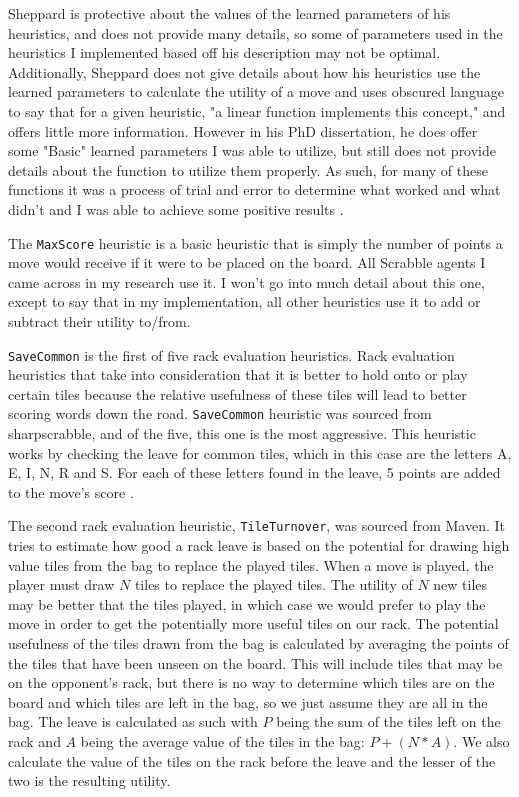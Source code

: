 \documentclass[letterpaper]{article}
\begin{document}
Sheppard is protective about the values of the learned parameters of his heuristics, and does not provide many details, so some of parameters used in the heuristics I implemented based off his description may not be optimal. Additionally, Sheppard does not give details about how his heuristics use the learned parameters to calculate the utility of a move and uses obscured language to say that for a given heuristic, "a linear function implements this concept," and offers little more information\cite{1sheppard2002}. However in his PhD dissertation, he does offer some "Basic" learned parameters I was able to utilize, but still does not provide details about the function to utilize them properly. As such, for many of these functions it was a process of trial and error to determine what worked and what didn't and I was able to achieve some positive results \cite{2sheppard2002}.

The \texttt{MaxScore} heuristic is a basic heuristic that is simply the number of points a move would receive if it were to be placed on the board. All Scrabble agents I came across in my research use it. I won't go into much detail about this one, except to say that in my implementation, all other heuristics use it to add or subtract their utility to/from.

\texttt{SaveCommon} is the first of five rack evaluation heuristics. Rack evaluation heuristics that take into consideration that it is better to hold onto or play certain tiles because the relative usefulness of these tiles will lead to better scoring words down the road. \texttt{SaveCommon} heuristic was sourced from sharpscrabble, and of the five, this one is the most aggressive. This heuristic works by checking the leave for common tiles, which in this case are the letters A, E, I, N, R and S. For each of these letters found in the leave, 5 points are added to the move's score \cite{sharpscrabble}.

The second rack evaluation heuristic, \texttt{TileTurnover}, was sourced from Maven. It tries to estimate how good a rack leave is based on the potential for drawing high value tiles from the bag to replace the played tiles. When a move is played, the player must draw $N$ tiles to replace the played tiles. The utility of $N$ new tiles may be better that the tiles played, in which case we would prefer to play the move in order to get the potentially more useful tiles on our rack. The potential usefulness of the tiles drawn from the bag is calculated by averaging the points of the  tiles that have been unseen on the board. This will include tiles that may be on the opponent's rack, but there is no way to determine which tiles are on the board and which tiles are left in the bag, so we just assume they are all in the bag. The leave is calculated as such with $P$ being the sum of the tiles left on the rack and $A$ being the average value of the tiles in the bag: $P + (N * A)$. We also calculate the value of the tiles on the rack before the leave and the lesser of the two is the resulting utility.
\end{document}
